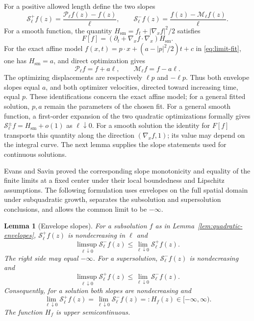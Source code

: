 \documentclass[11pt]{article}
\numberwithin{equation}{section}
\newtheorem{lemma}[theorem]{Lemma}
\theoremstyle{definition}
\theoremstyle{remark}
\newcommand{\Penv}{\mathcal{P}}
\newcommand{\Menv}{\mathcal{M}}
\newcommand{\Senv}{\mathcal{S}}
\begin{document}
For a positive allowed length define the two slopes
\begin{equation}\label{eq:envelope-slopes}
  \Senv_\ell^+f(z)=\frac{\Penv_\ell f(z)-f(z)}{\ell},
  \qquad
  \Senv_\ell^-f(z)=\frac{f(z)-\Menv_\ell f(z)}{\ell}.
\end{equation}
For a smooth function, the quantity
$H_{\mathrm{sm}}=f_t+|\nabla_xf|^2/2$ satisfies
\[
  F[f]=(\partial_t+\nabla_xf\cdot\nabla_x)H_{\mathrm{sm}}.
\]
For the exact affine model
$f(x,t)=p\cdot x+(a-|p|^2/2)t+c$ in \eqref{eq:limit-fit}, one has
$H_{\mathrm{sm}}=a$, and direct optimization gives
\[
  \Penv_\ell f=f+a\ell,\qquad \Menv_\ell f=f-a\ell.
\]
The optimizing displacements are respectively $\ell p$ and $-\ell p$.
Thus both envelope slopes equal $a$, and both optimizer velocities,
directed toward increasing time, equal $p$. These identifications concern
the exact affine model; for a general fitted solution, $p,a$ remain the
parameters of the chosen fit. For a general smooth function, a first-order
expansion of the two quadratic optimizations formally gives
$\Senv_\ell^\pm f=H_{\mathrm{sm}}+o(1)$ as $\ell\downarrow0$.
For a smooth solution the identity for $F[f]$ transports this quantity along
the direction $(\nabla_xf,1)$; its value may depend on the integral curve.
The next lemma supplies the slope statements used for continuous solutions.

Evans and Savin \cite[Theorem~3.1]{EvansSavin2008} proved the corresponding
slope monotonicity and equality of the finite limits at a fixed center under
their local boundedness and Lipschitz assumptions. The following formulation
uses envelopes on the full spatial domain under subquadratic growth,
separates the subsolution and supersolution conclusions, and allows the common
limit to be $-\infty$.

\begin{lemma}[Envelope slopes]\label{lem:envelope-slopes}
For a subsolution $f$ as in Lemma~\ref{lem:quadratic-envelopes},
$\Senv_\ell^+f(z)$ is nondecreasing in $\ell$ and
\begin{equation}\label{eq:subsolution-slope-order}
  \limsup_{\ell\downarrow0}\Senv_\ell^-f(z)
       \le\lim_{\ell\downarrow0}\Senv_\ell^+f(z).
\end{equation}
The right side may equal $-\infty$. For a supersolution,
$\Senv_\ell^-f(z)$ is nondecreasing and
\[
  \limsup_{\ell\downarrow0}\Senv_\ell^+f(z)
       \le\lim_{\ell\downarrow0}\Senv_\ell^-f(z).
\]
Consequently, for a
solution both slopes are nondecreasing and
\begin{equation}\label{eq:hamiltonian}
  \lim_{\ell\downarrow0}\Senv_\ell^+f(z)
  =\lim_{\ell\downarrow0}\Senv_\ell^-f(z)
  =:H_f(z)\in[-\infty,\infty).
\end{equation}
The function $H_f$ is upper semicontinuous.
\end{lemma}
\end{document}
